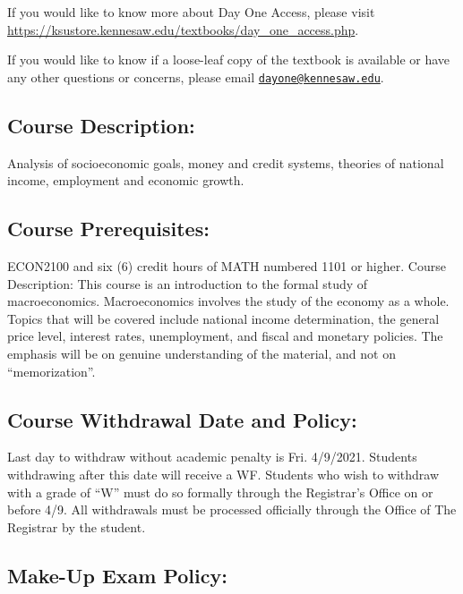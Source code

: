 \documentclass[11pt,]{article}
\begin{document}
If you would like to know more about Day One Access, please visit
\url{https://ksustore.kennesaw.edu/textbooks/day_one_access.php}.

If you would like to know if a loose-leaf copy of the textbook is available or have any other
questions or concerns, please email \href{mailto:dayone@kennesaw.edu}{\nolinkurl{dayone@kennesaw.edu}}.

\hypertarget{course-description}{%
\subsection{Course Description:}\label{course-description}}

Analysis of socioeconomic goals, money and credit systems, theories of national
income, employment and economic growth.

\hypertarget{course-prerequisites}{%
\subsection{Course Prerequisites:}\label{course-prerequisites}}

ECON2100 and six (6) credit hours of MATH numbered 1101 or higher.
Course Description: This course is an introduction to the formal study of macroeconomics.
Macroeconomics involves the study of the economy as a whole. Topics that will be covered include national
income determination, the general price level, interest rates, unemployment, and fiscal and monetary policies.
The emphasis will be on genuine understanding of the material, and not on ``memorization''.

\hypertarget{course-withdrawal-date-and-policy}{%
\subsection{Course Withdrawal Date and Policy:}\label{course-withdrawal-date-and-policy}}

Last day to withdraw without academic penalty is Fri. 4/9/2021.
Students withdrawing after this date will receive a WF. Students who wish to withdraw with a grade of ``W''
must do so formally through the Registrar's Office on or before 4/9. All withdrawals must be processed
officially through the Office of The Registrar by the student.

\hypertarget{make-up-exam-policy}{%
\subsection{Make-Up Exam Policy:}\label{make-up-exam-policy}}
\end{document}
